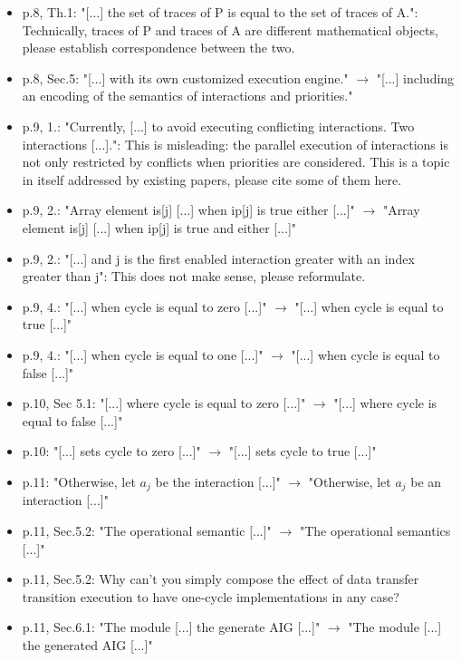 \begin{itemize}
\item p.8, Th.1: "[...] the set of traces of P is equal to the set of traces of 
A.": Technically, traces of P and traces of A are different mathematical 
objects, please establish correspondence between the two.
\done
{}

\item p.8, Sec.5: "[...] with its own customized execution engine." $\rightarrow$ "[...] 
including an encoding of the semantics of interactions and priorities."
\item p.9, 1.: "Currently, [...] to avoid executing conflicting interactions. Two 
interactions [...].": This is misleading: the parallel execution of 
interactions is not only restricted by conflicts when priorities are 
considered. This is a topic in itself addressed by existing papers, please 
cite some of them here.
\item p.9, 2.: "Array element is[j] [...] when ip[j] is true either [...]" $\rightarrow$ 
"Array element is[j] [...] when ip[j] is true and either [...]"
\item p.9, 2.: "[...] and j is the first enabled interaction greater with an 
index greater than j": This does not make sense, please reformulate.
\done
\item p.9, 4.: "[...] when cycle is equal to zero [...]" $\rightarrow$ "[...] when cycle is 
equal to true [...]"
\done
\item p.9, 4.: "[...] when cycle is equal to one [...]" $\rightarrow$ "[...] when cycle is 
equal to false [...]"
\done
\item p.10, Sec 5.1: "[...] where cycle is equal to zero [...]" $\rightarrow$ "[...] where 
cycle is equal to false [...]"
\done
\item p.10: "[...] sets cycle to zero [...]" $\rightarrow$ "[...] sets cycle to true [...]"
\done
\item p.11: "Otherwise, let $a_j$ be the interaction [...]" $\rightarrow$ "Otherwise, let $a_j$ 
be an interaction [...]"
\done
\item p.11, Sec.5.2: "The operational semantic [...]" $\rightarrow$ "The operational 
semantics [...]"
\done
\item p.11, Sec.5.2: Why can't you simply compose the effect of data transfer 
transition execution to have one-cycle implementations in any case?
\item p.11, Sec.6.1: "The module [...] the generate AIG [...]" $\rightarrow$ "The module 
[...] the generated AIG [...]"
\done
\end{itemize}
